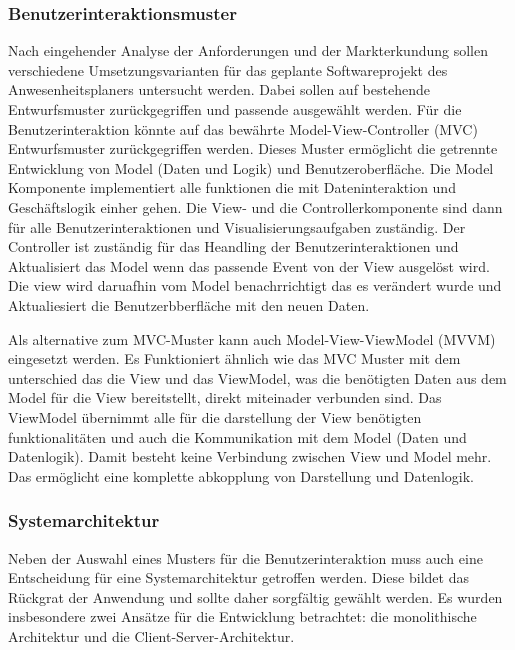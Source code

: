 \subsubsection{Benutzerinteraktionsmuster}
\label{sec:Benutzerinteraktionsmuster}
Nach eingehender Analyse der Anforderungen und der Markterkundung sollen verschiedene Umsetzungsvarianten für das geplante Softwareprojekt des Anwesenheitsplaners untersucht werden. Dabei sollen auf bestehende Entwurfsmuster zurückgegriffen und passende ausgewählt werden. Für die Benutzerinteraktion könnte auf das bewährte Model-View-Controller (MVC) Entwurfsmuster zurückgegriffen werden. Dieses Muster ermöglicht die getrennte Entwicklung von Model (Daten und Logik) und Benutzeroberfläche. Die Model Komponente implementiert alle funktionen die mit Dateninteraktion und Geschäftslogik einher gehen. Die View- und die Controllerkomponente sind dann für alle Benutzerinteraktionen und Visualisierungsaufgaben zuständig. Der Controller ist zuständig für das Heandling der Benutzerinteraktionen und Aktualisiert das Model wenn das passende Event von der View ausgelöst wird. Die view wird daruafhin vom Model benachrrichtigt das es verändert wurde und Aktualiesiert die Benutzerbberfläche mit den neuen Daten.%

Als alternative zum MVC-Muster kann auch Model-View-ViewModel (MVVM) eingesetzt werden. Es Funktioniert ähnlich wie das MVC Muster mit dem unterschied das die View und das ViewModel, was die benötigten Daten aus dem Model für die View bereitstellt, direkt miteinader verbunden sind. Das ViewModel übernimmt alle für die darstellung der View benötigten funktionalitäten und auch die Kommunikation mit dem Model (Daten und Datenlogik). Damit besteht keine Verbindung zwischen View und Model mehr. Das ermöglicht eine komplette abkopplung von Darstellung und Datenlogik.

\subsubsection{Systemarchitektur}
\label{sec:Systemarchitektur}
Neben der Auswahl eines Musters für die Benutzerinteraktion muss auch eine Entscheidung für eine Systemarchitektur getroffen werden. Diese bildet das Rückgrat der Anwendung und sollte daher sorgfältig gewählt werden. Es wurden insbesondere zwei Ansätze für die Entwicklung betrachtet: die monolithische Architektur und die Client-Server-Architektur.

